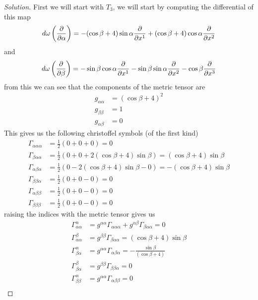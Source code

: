 \documentclass[a4paper]{article}
\begin{document}
\begin{proof}[Solution]
  First we will start with $T_3$, we will start by computing the differential of this map
  \[
    d \omega \left( \pdv{\alpha} \right) = -(\cos \beta + 4) \sin \alpha \pdv{x^1} + (\cos \beta + 4) \cos \alpha \pdv{x^2}
  \]
  and 
  \[
    d \omega \left( \pdv{\beta} \right) = - \sin \beta \cos \alpha \pdv{x^1} - \sin \beta \sin \alpha \pdv{x^2} - \cos \beta \pdv{x^3}
  \]
  from this we can see that the components of the metric tensor are
  \[
    \begin{aligned}
      g_{\alpha \alpha} &= (\cos \beta + 4)^2 \\
      g_{\beta \beta} &=  1 \\
      g_{\alpha \beta} &= 0
    \end{aligned}
  \]
  This gives us the following christoffel symbols (of the first kind)
  \[
    \begin{aligned}
      \Gamma_{\alpha \alpha \alpha} &= \frac{1}{2}\left(0 + 0 + 0 \right) = 0 \\
      \Gamma_{\beta \alpha \alpha} &= \frac{1}{2} \left(0 + 0 + 2(\cos\beta + 4)\sin \beta \right) = (\cos \beta + 4) \sin \beta \\
      \Gamma_{\alpha \beta \alpha} &= \frac{1}{2} \left(0 - 2(\cos \beta + 4)\sin \beta - 0\right) = -(\cos \beta + 4) \sin \beta \\
      \Gamma_{\beta \beta \alpha} &= \frac{1}{2} \left(0 + 0 - 0 \right) = 0 \\
      \Gamma_{\alpha \beta \beta} &= \frac{1}{2} \left(0 + 0 - 0 \right) = 0 \\
      \Gamma_{\beta \beta \beta} &= \frac{1}{2} \left(0 + 0 - 0 \right) = 0 
    \end{aligned}
  \]
  raising the indices with the metric tensor gives us
  \[
    \begin{aligned}
      \Gamma^\alpha_{\alpha \alpha} &= g^{\alpha \alpha} \Gamma_{\alpha \alpha \alpha} + g^{\alpha \beta} \Gamma_{\beta \alpha \alpha} = 0 \\
    \Gamma^\beta_{\alpha \alpha} &= g^{\beta \beta} \Gamma_{\beta \alpha \alpha} = (\cos \beta + 4)\sin \beta \\
    \Gamma^\alpha_{\beta \alpha} &= g^{\alpha \alpha} \Gamma_{\alpha \beta \alpha} = - \frac{\sin \beta}{(\cos \beta + 4)} \\
    \Gamma^\beta_{\beta \alpha} &= g^{\beta \beta} \Gamma_{\beta \beta \alpha} = 0 \\
    \Gamma^\alpha_{\beta \beta} &= g^{\alpha \alpha} \Gamma_{\alpha \beta \beta} = 0 \\

\end{aligned}\]
\end{proof}
\end{document}
